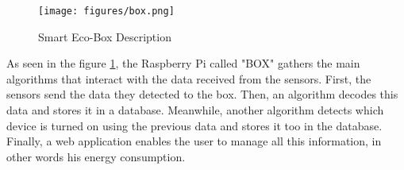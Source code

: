 \begin{figure}[H]
\centering
\texttt{[image: figures/box.png]}
\caption{Smart Eco-Box Description}
\label{fig:boxDescription}
\end{figure}

As seen in the figure \ref{fig:boxDescription}, the Raspberry Pi called "BOX" gathers the main algorithms that interact with the data received from the sensors. First, the sensors send the data they detected to the box. Then, an algorithm decodes this data and stores it in a database. Meanwhile, another algorithm detects which device is turned on using the previous data and stores it too in the database. Finally, a web application enables the user to manage all this information, in other words his energy consumption.

